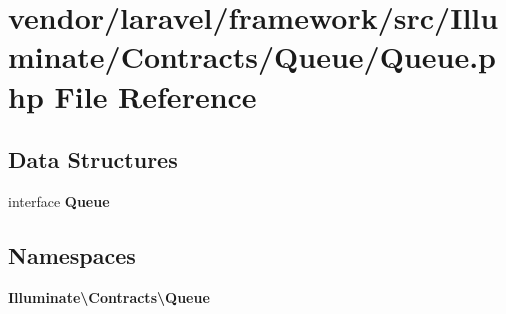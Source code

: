 \section{vendor/laravel/framework/src/\+Illuminate/\+Contracts/\+Queue/\+Queue.php File Reference}
\label{vendor_2laravel_2framework_2src_2_illuminate_2_contracts_2_queue_2queue_8php}
\subsection*{Data Structures}
\begin{DoxyCompactItemize}
\item 
interface {\bf Queue}
\end{DoxyCompactItemize}
\subsection*{Namespaces}
\begin{DoxyCompactItemize}
\item 
 {\bf Illuminate\textbackslash{}\+Contracts\textbackslash{}\+Queue}
\end{DoxyCompactItemize}
